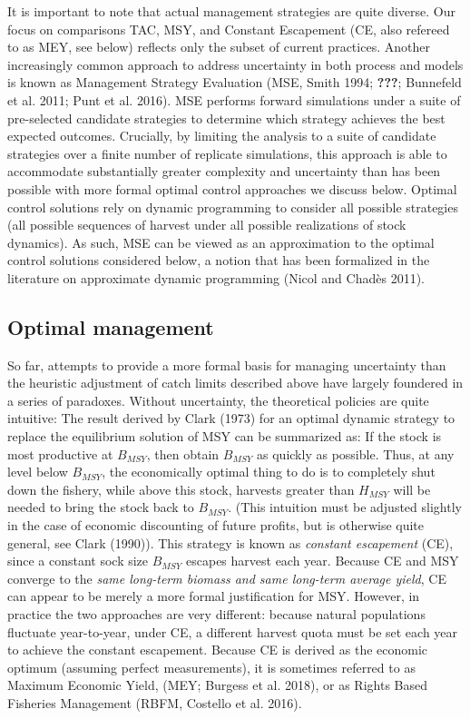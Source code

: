 \documentclass[3p]{elsarticle} %
\begin{document}
It is important to note that actual management strategies are quite
diverse. Our focus on comparisons TAC, MSY, and Constant Escapement (CE,
also refereed to as MEY, see below) reflects only the subset of current
practices. Another increasingly common approach to address uncertainty
in both process and models is known as Management Strategy Evaluation
(MSE, Smith 1994; {\textbf{???}}; Bunnefeld et al. 2011; Punt et al.
2016). MSE performs forward simulations under a suite of pre-selected
candidate strategies to determine which strategy achieves the best
expected outcomes. Crucially, by limiting the analysis to a suite of
candidate strategies over a finite number of replicate simulations, this
approach is able to accommodate substantially greater complexity and
uncertainty than has been possible with more formal optimal control
approaches we discuss below. Optimal control solutions rely on dynamic
programming to consider all possible strategies (all possible sequences
of harvest under all possible realizations of stock dynamics). As such,
MSE can be viewed as an approximation to the optimal control solutions
considered below, a notion that has been formalized in the literature on
approximate dynamic programming (Nicol and Chadès 2011).

\hypertarget{optimal-management}{%
\subsection{Optimal management}\label{optimal-management}}

So far, attempts to provide a more formal basis for managing uncertainty
than the heuristic adjustment of catch limits described above have
largely foundered in a series of paradoxes. Without uncertainty, the
theoretical policies are quite intuitive: The result derived by Clark
(1973) for an optimal dynamic strategy to replace the equilibrium
solution of MSY can be summarized as: If the stock is most productive at
\(B_{MSY}\), then obtain \(B_{MSY}\) as quickly as possible. Thus, at
any level below \(B_{MSY}\), the economically optimal thing to do is to
completely shut down the fishery, while above this stock, harvests
greater than \(H_{MSY}\) will be needed to bring the stock back to
\(B_{MSY}\). (This intuition must be adjusted slightly in the case of
economic discounting of future profits, but is otherwise quite general,
see Clark (1990)). This strategy is known as \emph{constant escapement}
(CE), since a constant sock size \(B_{MSY}\) escapes harvest each year.
Because CE and MSY converge to the \emph{same long-term biomass and same
long-term average yield}, CE can appear to be merely a more formal
justification for MSY. However, in practice the two approaches are very
different: because natural populations fluctuate year-to-year, under CE,
a different harvest quota must be set each year to achieve the constant
escapement. Because CE is derived as the economic optimum (assuming
perfect measurements), it is sometimes referred to as Maximum Economic
Yield, (MEY; Burgess et al. 2018), or as Rights Based Fisheries
Management (RBFM, Costello et al. 2016).
\end{document}
